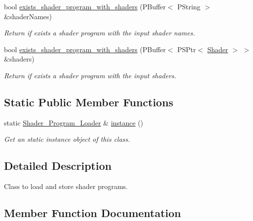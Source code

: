 \begin{DoxyCompactItemize}
bool \mbox{\hyperlink{classprz_1_1_shader___program___loader_a2d0b7273a7c0d96a59a29e392670f998}{exists\+\_\+shader\+\_\+program\+\_\+with\+\_\+shaders}} (P\+Buffer$<$ P\+String $>$ \&shader\+Names)
\begin{DoxyCompactList}\small\item\em Return if exists a shader program with the input shader names. \end{DoxyCompactList}\item 
bool \mbox{\hyperlink{classprz_1_1_shader___program___loader_abd5dbe883d8585c87fade3b2bad85f05}{exists\+\_\+shader\+\_\+program\+\_\+with\+\_\+shaders}} (P\+Buffer$<$ P\+S\+Ptr$<$ \mbox{\hyperlink{classprz_1_1_shader}{Shader}} $>$ $>$ \&shaders)
\begin{DoxyCompactList}\small\item\em Return if exists a shader program with the input shaders. \end{DoxyCompactList}\end{DoxyCompactItemize}
\subsection*{Static Public Member Functions}
\begin{DoxyCompactItemize}
\item 
static \mbox{\hyperlink{classprz_1_1_shader___program___loader}{Shader\+\_\+\+Program\+\_\+\+Loader}} \& \mbox{\hyperlink{classprz_1_1_shader___program___loader_a53c57a4fe69fe9b343124d7d6e0c373c}{instance}} ()
\begin{DoxyCompactList}\small\item\em Get an static instance object of this class. \end{DoxyCompactList}\end{DoxyCompactItemize}


\subsection{Detailed Description}
Class to load and store shader programs. 



\subsection{Member Function Documentation}
\mbox{\label{classprz_1_1_shader___program___loader_a8f29cfe9fe72b5c1b5b92f327aaa8ec4}} 
